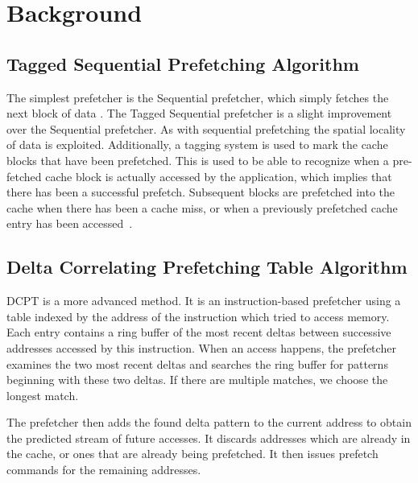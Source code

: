 \section{Background}


\subsection{Tagged Sequential Prefetching Algorithm}

The simplest prefetcher is the Sequential prefetcher, which simply fetches the
next block of data \cite{seq}. The Tagged Sequential prefetcher is a slight
improvement over the Sequential prefetcher. As with sequential prefetching the
spatial locality of data is exploited. Additionally, a tagging system is used to
mark the cache blocks that have been prefetched. This is used to be able to
recognize when a pre-fetched cache block is actually accessed by the
application, which implies that there has been a successful prefetch. Subsequent
blocks are prefetched into the cache when there has been a cache miss, or when a
previously prefetched cache entry has been accessed~\cite{grannaes}.

\subsection{Delta Correlating Prefetching Table Algorithm}

DCPT is a more advanced method. It is an instruction-based prefetcher using a
table indexed by the address of the instruction which tried to access memory.
Each entry contains a ring buffer of the most recent deltas between successive
addresses accessed by this instruction. When an access happens, the prefetcher
examines the two most recent deltas and searches the ring buffer for patterns
beginning with these two deltas. If there are multiple matches, we choose the
longest match.

The prefetcher then adds the found delta pattern to the current address to
obtain the predicted stream of future accesses. It discards addresses which
are already in the cache, or ones that are already being prefetched. It then
issues prefetch commands for the remaining addresses.



